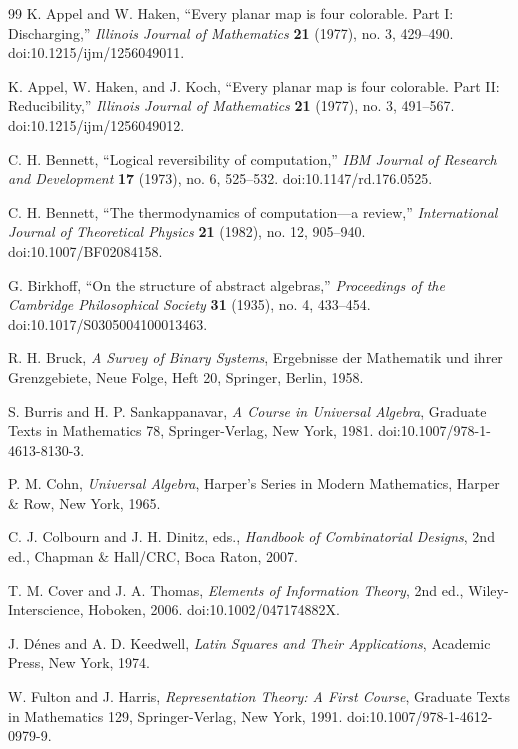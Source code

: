 \documentclass[11pt]{article}
\theoremstyle{definition}
\begin{document}
\newpage
\begin{thebibliography}{99}
 K. Appel and W. Haken, ``Every planar map is four colorable. Part I:
Discharging,'' \emph{Illinois Journal of Mathematics} \textbf{21}
(1977), no. 3, 429--490. doi:10.1215/ijm/1256049011.

 K. Appel, W. Haken, and J. Koch, ``Every planar map is four colorable.
Part II: Reducibility,'' \emph{Illinois Journal of Mathematics}
\textbf{21} (1977), no. 3, 491--567. doi:10.1215/ijm/1256049012.

 C. H. Bennett, ``Logical reversibility of computation,'' \emph{IBM
Journal of Research and Development} \textbf{17} (1973), no. 6,
525--532. doi:10.1147/rd.176.0525.

 C. H. Bennett, ``The thermodynamics of computation---a review,''
\emph{International Journal of Theoretical Physics} \textbf{21} (1982),
no. 12, 905--940. doi:10.1007/BF02084158.

 G. Birkhoff, ``On the structure of abstract algebras,''
\emph{Proceedings of the Cambridge Philosophical Society} \textbf{31}
(1935), no. 4, 433--454. doi:10.1017/S0305004100013463.

 R. H. Bruck, \emph{A Survey of Binary Systems}, Ergebnisse der
Mathematik und ihrer Grenzgebiete, Neue Folge, Heft 20, Springer,
Berlin, 1958.

 S. Burris and H. P. Sankappanavar, \emph{A Course in Universal Algebra},
Graduate Texts in Mathematics 78, Springer-Verlag, New York, 1981.
doi:10.1007/978-1-4613-8130-3.

 P. M. Cohn, \emph{Universal Algebra}, Harper's Series in Modern
Mathematics, Harper \& Row, New York, 1965.

 C. J. Colbourn and J. H. Dinitz, eds., \emph{Handbook of Combinatorial
Designs}, 2nd ed., Chapman \& Hall/CRC, Boca Raton, 2007.

 T. M. Cover and J. A. Thomas, \emph{Elements of Information Theory}, 2nd
ed., Wiley-Interscience, Hoboken, 2006. doi:10.1002/047174882X.

 J. Dénes and A. D. Keedwell, \emph{Latin Squares and Their
Applications}, Academic Press, New York, 1974.

 W. Fulton and J. Harris, \emph{Representation Theory: A First Course},
Graduate Texts in Mathematics 129, Springer-Verlag, New York, 1991.
doi:10.1007/978-1-4612-0979-9.


\end{thebibliography}
\end{document}
